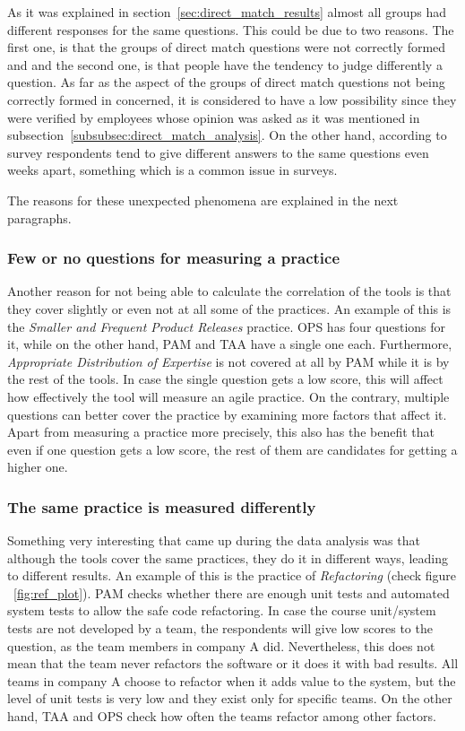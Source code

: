 As it was explained in section~\ref{sec:direct_match_results} almost all groups had different responses for the same questions. This could be due to two reasons. The first one, is that the groups of direct match questions were not correctly formed and and the second one, is that people have the tendency to judge differently a question. As far as the aspect of the groups of direct match questions not being correctly formed in concerned, it is considered to have a low possibility since they were verified by employees whose opinion was asked as it was mentioned in subsection~\ref{subsubsec:direct_match_analysis}. On the other hand, according to \citet{Lacy} survey respondents tend to give different answers to the same questions even weeks apart, something which is a common issue in surveys.

The reasons for these unexpected phenomena are explained in the next paragraphs.

\subsubsection{Few or no questions for measuring a practice}
Another reason for not being able to calculate the correlation of the tools is that they cover slightly or even not at all some of the practices. An example of this is the \textit{Smaller and Frequent Product Releases} practice. \ac{OPS} has four questions for it, while on the other hand, \ac{PAM} and \ac{TAA} have a single one each. Furthermore, \textit{Appropriate Distribution of Expertise} is not covered at all by \ac{PAM} while it is by the rest of the tools. In case the single question gets a low score, this will affect how effectively the tool will measure an agile practice. On the contrary, multiple questions can better cover the practice by examining more factors that affect it. Apart from measuring a practice more precisely, this also has the benefit that even if one question gets a low score, the rest of them are candidates for getting a higher one.

\subsubsection{The same practice is measured differently}
Something very interesting that came up during the data analysis was that although the tools cover the same practices, they do it in different ways, leading to different results. An example of this is the practice of \textit{Refactoring} (check figure ~\ref{fig:ref_plot}). \ac{PAM} checks whether there are enough unit tests and automated system tests to allow the safe code refactoring. In case the course unit/system tests are not developed by a team, the respondents will give low scores to the question, as the team members in company A did. Nevertheless, this does not mean that the team never refactors the software or it does it with bad results. All teams in company A choose to refactor when it adds value to the system, but the level of unit tests is very low and they exist only for specific teams. On the other hand, \ac{TAA} and \ac{OPS} check how often the teams refactor among other factors.

